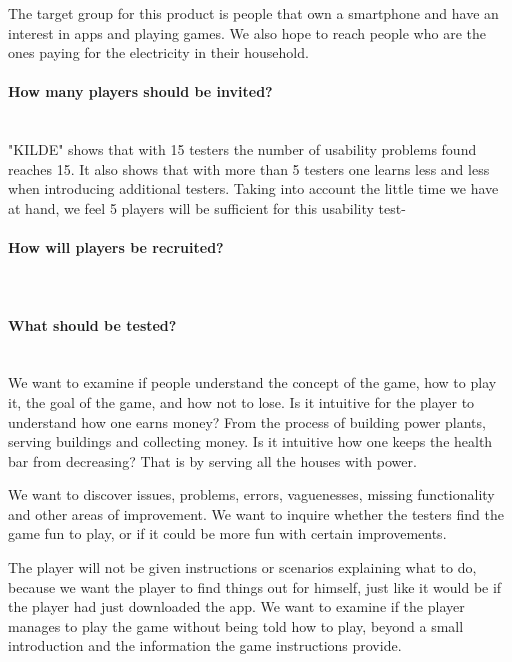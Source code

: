 The target group for this product is people that own a smartphone and have an interest in apps and playing games. We also hope to reach people who are the ones paying for the electricity in their household. 

\paragraph{How many players should be invited?}\mbox{}\\

"KILDE" shows that with 15 testers the number of usability problems found reaches 15. It also shows that with more than 5 testers one learns less and less when introducing additional testers. Taking into account the little time we have at hand, we feel 5 players will be sufficient for this usability test-

\paragraph{How will players be recruited?}\mbox{}\\




\paragraph{What should be tested?}\mbox{}\\

We want to examine if people understand the concept of the game, how to play it, the goal of the game, 
and how not to lose. Is it intuitive for the player to understand how one earns money? From the process 
of building power plants, serving buildings and collecting money. Is it intuitive how one keeps 
the health bar from decreasing? That is by serving all the houses with power.

We want to discover issues, problems, errors, vaguenesses, missing functionality and other areas 
of improvement. We want to inquire whether the testers find the game fun to play, or if it could 
be more fun with certain improvements.

The player will not be given instructions or scenarios explaining what to do, because we want 
the player to find things out for himself, just like it would be if the player had just 
downloaded the app. We want to examine if the player manages to play the game without being 
told how to play, beyond a small introduction and the information the game instructions provide. 

